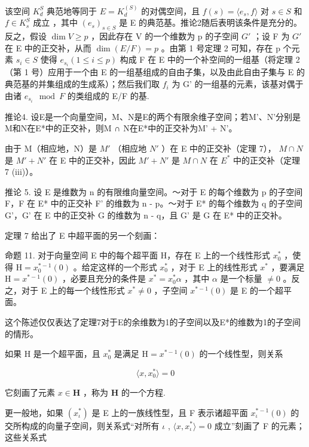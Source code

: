 该空间 \(K_{d}^{S}\) 典范地等同于 \(E = K_{d}^{(S)}\) 的对偶空间，且 \(f(s) = \langle e_{s}, f \rangle\) 对 \(s \in S\) 和 \(f \in K_{s}^{S}\) 成立 ，其中 \((e_{s})_{s \in S}\) 是 E 的典范基。推论2随后表明该条件是充分的。反之，假设 \(\dim V \geqslant p\) ，因此存在 V 的一个维数为 p 的子空间 \(G'\) ；设 F 为 \(G'\) 在 E 中的正交补，从而 \(\dim(E/F) = p\) 。由第 1 号定理 2 可知，存在 p 个元素 \(s_{i} \in S\) 使得 \(e_{s_{i}} (1 \leqslant i \leqslant p)\) 构成 F 在 E 中的一个补空间的一组基（将定理 2（第 1 号）应用于一个由 E 的一组基组成的自由子集，以及由此自由子集与 E 的典范基的并集组成的生成系）；然后我们取 \(f_{i}\) 为 G' 的一组基的元素，该基对偶于由诸 \(e_{s_{i}} \mod F\) 的类组成的 E/F 的基.

推论4. 设E是一个向量空间，M、N是E的两个有限余维子空间；若M'、N'分别是M和N在E*中的正交补，则M ∩ N在E*中的正交补为M' + N'。

由于 M（相应地，N）是 \(M'\) （相应地 \(N'\) ）在 E 中的正交补（定理 7）， \(M \cap N\) 是 \(M' + N'\) 在 E 中的正交补，因此 \(M' + N'\) 是 \(M \cap N\) 在 \(E^*\) 中的正交补（定理 7 (iii)）。

推论 5. 设 E 是维数为 n 的有限维向量空间。～对于 E 的每个维数为 p 的子空间 F，F 在 E* 中的正交补 F' 的维数为 n - p。～对于 E* 的每个维数为 q 的子空间 G'，G' 在 E 中的正交补 G 的维数为 n - q，且 G' 是 G 在 E* 中的正交补。

定理 7 给出了 E 中超平面的另一个刻画：

命题 11. 对于向量空间 E 中的每个超平面 H，存在 E 上的一个线性形式 \(x_0^*\) ，使得 \(\mathrm{H} = x_0^{*-1}(0)\) 。给定这样的一个形式 \(x_0^*\) ，对于 E 上的线性形式 \(x^*\) ，要满足 \(\mathrm{H} = x^{*-1}(0)\) ，必要且充分的条件是 \(x^* = x_0^*\alpha\) ，其中 \(\alpha\) 是一个标量 \(\neq 0\) 。反之，对于 E 上的每一个线性形式 \(x^* \neq 0\) ，子空间 \(x^{*-1}(0)\) 是 E 的一个超平面。

这个陈述仅仅表达了定理7对于E的余维数为1的子空间以及E*的维数为1的子空间的情形。

如果 H 是一个超平面，且 \(x_{0}^{*}\) 是满足 \(\mathrm{H}=x^{*-1}(0)\) 的一个线性型，则关系

\[
\langle x, x _ {0} ^ {*} \rangle = 0
\]

它刻画了元素 \(x \in \mathbf{H}\) ，称为 \(\mathbf{H}\) 的一个方程.

更一般地，如果 \((x_{\iota}^{*})\) 是 E 上的一族线性型，且 F 表示诸超平面 \(x_{\iota}^{*-1}(0)\) 的交所构成的向量子空间，则关系式“对所有 \(\iota\) , \(\langle x, x_{\iota}^{*}\rangle = 0\) 成立”刻画了 F 的元素；这些关系式

